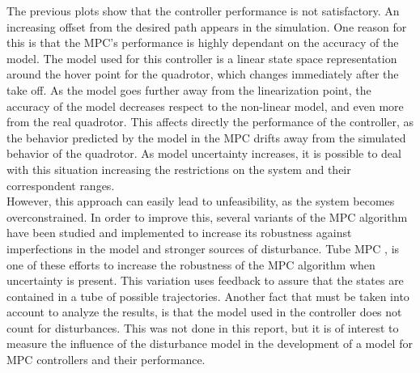 The previous plots show that the controller performance is not satisfactory. An increasing offset from the desired path appears in the simulation. One reason for this is that the MPC's performance is highly dependant on the accuracy of the model. The model used for this controller is a linear state space representation around the hover point for the quadrotor, which changes immediately after the take off. As the model goes further away from the linearization point, the accuracy of the model decreases respect to the non-linear model, and even more from the real quadrotor. This affects directly the performance of the controller, as the behavior predicted by the model in the MPC drifts away from the simulated behavior of the quadrotor. As model uncertainty increases, it is possible to deal with this situation increasing the restrictions on the system and their correspondent ranges.\\

 However, this approach can easily lead to unfeasibility, as the system becomes overconstrained. In order to improve this, several variants of the MPC algorithm have been studied and implemented to increase its robustness against imperfections in the model and stronger sources of disturbance. Tube MPC \cite{RakovicetAl2010}, is one of these efforts to increase the robustness of the MPC algorithm when uncertainty is present. This variation uses feedback to assure that the states are contained in a tube of possible trajectories. Another fact that must be taken into account to analyze the results, is that the model used in the controller does not count for disturbances. This was not done in this report, but it is of interest to measure the influence of the disturbance model in the development of a model for MPC controllers and their performance. 








  




